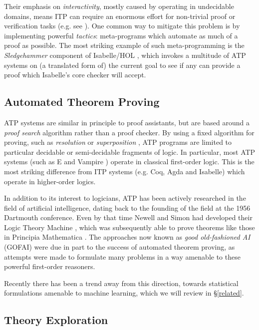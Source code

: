 \documentclass[]{article}
\begin{document}
Their emphasis on \emph{interactivity}, mostly caused by operating in undecidable domains, means ITP can require an enormous effort for non-trivial proof or verification tasks (e.g. see \cite{hales2015formal}). One common way to mitigate this problem is by implementing powerful \emph{tactics}: meta-programs which automate as much of a proof as possible. The most striking example of such meta-programming is the \emph{Sledgehammer} component of Isabelle/HOL \cite{journals/iandc/MengQP06}, which invokes a multitude of ATP systems on (a translated form of) the current goal to see if any can provide a proof which Isabelle's core checker will accept.

\subsection{Automated Theorem Proving}
\label{atp}

ATP systems are similar in principle to proof assistants, but are based around a \emph{proof search} algorithm rather than a proof checker. By using a fixed algorithm for proving, such as \emph{resolution} \cite[\S~9.6]{Russell:2003:AIM:773294} or \emph{superposition} \cite{bachmair1994rewrite}, ATP programs are limited to particular decidable or semi-decidable fragments of logic. In particular, most ATP systems (such as E \cite{schulz2013system} and Vampire \cite{riazanov2003implementing}) operate in classical first-order logic. This is the most striking difference from ITP systems (e.g. Coq, Agda and Isabelle) which operate in higher-order logics.

In addition to its interest to logicians, ATP has been actively researched in the field of artificial intelligence, dating back to the founding of the field at the 1956 Dartmouth conference. Even by that time Newell and Simon had developed their Logic Theory Machine \cite{newell1956logic}, which was subsequently able to prove theorems like those in Principia Mathematica \cite{newell1958elements}. The approaches now known as \emph{good old-fashioned AI} (GOFAI) were due in part to the success of automated theorem proving, as attempts were made to formulate many problems in a way amenable to these powerful first-order reasoners.

Recently there has been a trend away from this direction, towards statistical formulations amenable to machine learning, which we will review in \S \ref{related}.

\subsection{Theory Exploration}
\label{theoryexploration}
\end{document}
